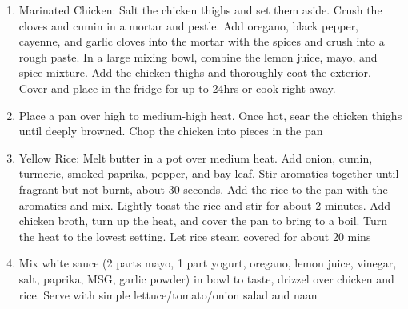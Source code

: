 \documentclass[]{report}
\begin{document}
            {\begin{enumerate}    %
                  \item Marinated Chicken: Salt the chicken thighs and set them aside. Crush the cloves and cumin in a mortar and pestle. Add oregano, black pepper, cayenne, and garlic cloves into the mortar with the spices and crush into a rough paste. In a large mixing bowl, combine the lemon juice, mayo, and spice mixture. Add the chicken thighs and thoroughly coat the exterior. Cover and place in the fridge for up to 24hrs or cook right away.
                  \item Place a pan over high to medium-high heat. Once hot, sear the chicken thighs until deeply browned. Chop the chicken into pieces in the pan
                  \item Yellow Rice: Melt butter in a pot over medium heat. Add onion, cumin, turmeric, smoked paprika, pepper, and bay leaf. Stir aromatics together until fragrant but not burnt, about 30 seconds. Add the rice to the pan with the aromatics and mix. Lightly toast the rice and stir for about 2 minutes. Add chicken broth, turn up the heat, and cover the pan to bring to a boil. Turn the heat to the lowest setting. Let rice steam covered for about 20 mins
                  \item Mix white sauce (2 parts mayo, 1 part yogurt, oregano, lemon juice, vinegar, salt, paprika, MSG, garlic powder) in bowl to taste, drizzel over chicken and rice. Serve with simple lettuce/tomato/onion salad and naan
            \end{enumerate}}
\end{document}
